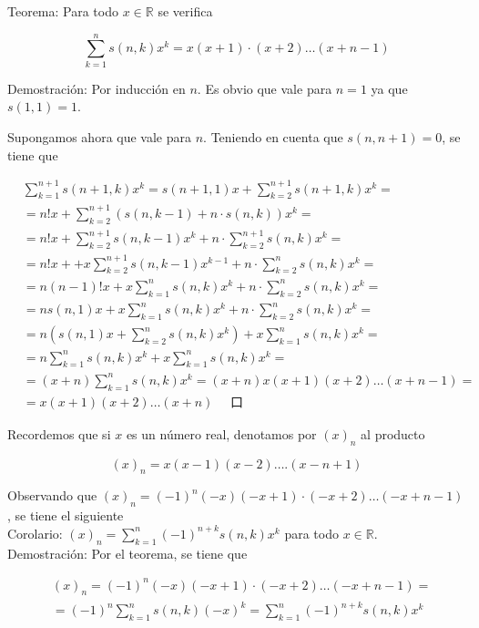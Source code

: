 \documentclass[10pt]{article}
\begin{document}
Teorema: Para todo $x \in \mathbb{R}$ se verifica

$$
\sum_{k=1}^{n} s(n, k) x^{k}=x(x+1) \cdot(x+2) \ldots(x+n-1)
$$

Demostración: Por inducción en $n$. Es obvio que vale para $n=1$ ya que $s(1,1)=1$.

Supongamos ahora que vale para $n$. Teniendo en cuenta que $s(n, n+1)=0$, se tiene que

$$
\begin{aligned}
& \sum_{k=1}^{n+1} s(n+1, k) x^{k}=s(n+1,1) x+\sum_{k=2}^{n+1} s(n+1, k) x^{k}= \\
& =n!x+\sum_{k=2}^{n+1}(s(n, k-1)+n \cdot s(n, k)) x^{k}= \\
& =n!x+\sum_{k=2}^{n+1} s(n, k-1) x^{k}+n \cdot \sum_{k=2}^{n+1} s(n, k) x^{k}= \\
& =n!x++x \sum_{k=2}^{n+1} s(n, k-1) x^{k-1}+n \cdot \sum_{k=2}^{n} s(n, k) x^{k}= \\
& =n(n-1)!x+x \sum_{k=1}^{n} s(n, k) x^{k}+n \cdot \sum_{k=2}^{n} s(n, k) x^{k}= \\
& =n s(n, 1) x+x \sum_{k=1}^{n} s(n, k) x^{k}+n \cdot \sum_{k=2}^{n} s(n, k) x^{k}= \\
& =n\left(s(n, 1) x+\sum_{k=2}^{n} s(n, k) x^{k}\right)+x \sum_{k=1}^{n} s(n, k) x^{k}= \\
& =n \sum_{k=1}^{n} s(n, k) x^{k}+x \sum_{k=1}^{n} s(n, k) x^{k}= \\
& =(x+n) \sum_{k=1}^{n} s(n, k) x^{k}=(x+n) x(x+1)(x+2) \ldots(x+n-1)= \\
& =x(x+1)(x+2) \ldots(x+n) \quad \text { 口 }
\end{aligned}
$$

Recordemos que si $x$ es un número real, denotamos por $(x)_{n}$ al producto

$$
(x)_{n}=x(x-1)(x-2) \ldots .(x-n+1)
$$

Observando que $(x)_{n}=(-1)^{n}(-x)(-x+1) \cdot(-x+2) \ldots(-x+n-1)$, se tiene el siguiente\\
Corolario: $(x)_{n}=\sum_{k=1}^{n}(-1)^{n+k} s(n, k) x^{k}$ para todo $x \in \mathbb{R}$.\\
Demostración: Por el teorema, se tiene que

$$
\begin{aligned}
& (x)_{n}=(-1)^{n}(-x)(-x+1) \cdot(-x+2) \ldots(-x+n-1)= \\
& =(-1)^{n} \sum_{k=1}^{n} s(n, k)(-x)^{k}=\sum_{k=1}^{n}(-1)^{n+k} s(n, k) x^{k}
\end{aligned}
$$
\end{document}
